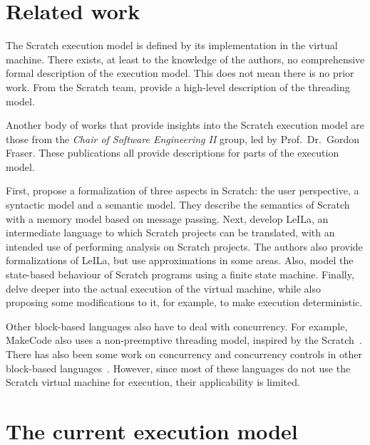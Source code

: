 \documentclass[../main]{subfiles}
\begin{document}
\section{Related work}\label{sec:execution-related-work}

The Scratch execution model is defined by its implementation in the virtual machine.
There exists, at least to the knowledge of the authors, no comprehensive formal description of the execution model.
This does not mean there is no prior work.
From the Scratch team, \textcite{maloneyScratchProgrammingLanguage2010a} provide a high-level description of the threading model.

Another body of works that provide insights into the Scratch execution model are those from the \emph{Chair of Software Engineering II} group, led by Prof.\ Dr.\ Gordon Fraser.
These publications all provide descriptions for parts of the execution model.

First, \textcite{stahlbauerTestingScratchPrograms2019} propose a formalization of three aspects in Scratch: the user perspective, a syntactic model and a semantic model.
They describe the semantics of Scratch with a memory model based on message passing.
Next, \textcite{stahlbauerVerifiedScratchProgram2020} develop LeILa, an intermediate language to which Scratch projects can be translated, with an intended use of performing analysis on Scratch projects.
The authors also provide formalizations of LeILa, but use approximations in some areas.
Also, \textcite{gotzModelbasedTestingScratch2022} model the state-based behaviour of Scratch programs using a finite state machine.
Finally, \textcite{deinerAutomatedTestGeneration2023} delve deeper into the actual execution of the virtual machine, while also proposing some modifications to it, for example, to make execution deterministic.

Other block-based languages also have to deal with concurrency.
For example, MakeCode also uses a non-preemptive threading model, inspired by the Scratch~\autocite{ballMicrosoftMakeCodeEmbedded2019a}.
There has also been some work on concurrency and concurrency controls in other block-based languages~\autocite{chungConCodeItComparisonConcurrency2020}.
However, since most of these languages do not use the Scratch virtual machine for execution, their applicability is limited.

\section{The current execution model}\label{sec:the-current-execution-model}
\end{document}
